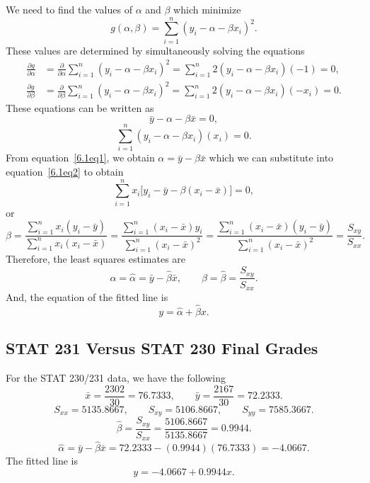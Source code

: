 \documentclass[oneside]{book}\usepackage[]{graphicx}\usepackage[svgnames]{xcolor}
\begin{document}
We need to find the values of $ \alpha $ and $ \beta $ which minimize
\[g(\alpha, \beta)=\sum_{i=1}^{n}(y_{i}-\alpha-\beta x_{i})^{2}.\]
These values are determined by simultaneously solving the equations
\begin{align*}
    \frac{\partial g}{\partial \alpha} & =\frac{\partial}{\partial \alpha} \sum_{i=1}^{n}(y_{i}-\alpha-\beta x_{i})^{2}=\sum_{i=1}^{n} 2(y_{i}-\alpha-\beta x_{i})(-1)=0,    \\
    \frac{\partial g}{\partial \beta}  & =\frac{\partial}{\partial \beta} \sum_{i=1}^{n}(y_{i}-\alpha-\beta x_{i})^{2}=\sum_{i=1}^{n} 2(y_{i}-\alpha-\beta x_{i})(-x_{i})=0.
\end{align*}
These equations can be written as
\begin{equation}\tag*{(1)}\label{6.1eq1}
    \bar{y}-\alpha-\beta \bar{x}=0,
\end{equation}
\begin{equation}\tag*{(2)}\label{6.1eq2}
    \sum_{i=1}^{n}(y_{i}-\alpha-\beta x_{i})(x_{i})=0.
\end{equation}
From equation~\ref{6.1eq1}, we obtain $ \alpha=\bar{y}-\beta \bar{x} $ which
we can substitute into equation~\ref{6.1eq2} to obtain
\[\sum_{i=1}^{n} x_{i}\bigl[y_{i}-\bar{y}-\beta(x_{i}-\bar{x})\bigr]=0,\]
or
\[\beta=
    \frac{\sum\limits_{i=1}^{n} x_{i}(y_{i}-\bar{y})}
    {\sum\limits_{i=1}^{n} x_{i}(x_{i}-\bar{x})}
    =\frac{\sum\limits_{i=1}^{n}(x_{i}-\bar{x}) y_{i}}
    {\sum\limits_{i=1}^{n}(x_{i}-\bar{x})^{2}}
    =\frac{\sum\limits_{i=1}^{n}(x_{i}-\bar{x})(y_{i}-\bar{y})}
    {\sum\limits_{i=1}^{n}(x_{i}-\bar{x})^{2}}
    =\frac{S_{x y}}{S_{x x}}.\]
Therefore, the least squares estimates are
\[\alpha=\hat{\alpha}=\bar{y}-\hat{\beta} \bar{x},
    \qquad \beta=\hat{\beta}=\frac{S_{x y}}{S_{x x}}.\]
And, the equation of the fitted line is
\[y=\hat{\alpha}+\hat{\beta} x.\]
\subsection{STAT 231 Versus STAT 230 Final Grades}
For the STAT 230/231 data, we have the following
\[\bar{x}=\frac{2302}{30}=76.7333,\qquad\bar{y}=\frac{2167}{30}=72.2333.\]
\[S_{x x}=5135.8667,\qquad S_{x y}=5106.8667,\qquad S_{y y}=7585.3667.\]
\[\hat{\beta}=\frac{S_{x y}}{S_{x x}}=\frac{5106.8667}{5135.8667}=0.9944.\]
\[\hat{\alpha}=\bar{y}-\hat{\beta} \bar{x}=72.2333-(0.9944)(76.7333)=-4.0667.\]
The fitted line is
\[y=-4.0667+0.9944 x.\]
\end{document}
